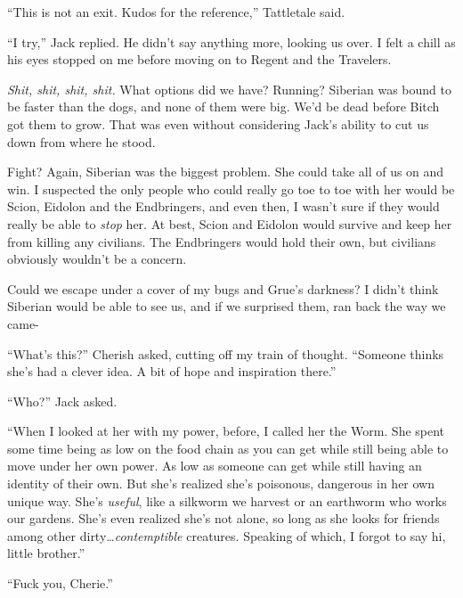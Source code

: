 
``This is not an exit.  Kudos for the reference,'' Tattletale said.



``I try,'' Jack replied.  He didn't say anything more, looking us over.  I felt a chill as his eyes stopped on me before moving on to Regent and the Travelers.



\emph{Shit, shit, shit, shit.}  What options did we have?  Running?  Siberian was bound to be faster than the dogs, and none of them were big.  We'd be dead before Bitch got them to grow.  That was even without considering Jack's ability to cut us down from where he stood.



Fight?  Again, Siberian was the biggest problem.  She could take all of us on and win.  I suspected the only people who could really go toe to toe with her would be Scion, Eidolon and the Endbringers, and even then, I wasn't sure if they would really be able to \emph{stop} her.  At best, Scion and Eidolon would survive and keep her from killing any civilians.  The Endbringers would hold their own, but civilians obviously wouldn't be a concern.



Could we escape under a cover of my bugs and Grue's darkness?  I didn't think Siberian would be able to see us, and if we surprised them, ran back the way we came-



``What's this?'' Cherish asked, cutting off my train of thought. ``Someone thinks she's had a clever idea.  A bit of hope and inspiration there.''



``Who?'' Jack asked.



``When I looked at her with my power, before, I called her the Worm.  She spent some time being as low on the food chain as you can get while still being able to move under her own power.  As low as someone can get while still having an identity of their own.  But she's realized she's poisonous, dangerous in her own unique way.  She's \emph{useful}, like a silkworm we harvest or an earthworm who works our gardens.  She's even realized she's not alone, so long as she looks for friends among other dirty\ldots \emph{contemptible} creatures.  Speaking of which, I forgot to say hi, little brother.''



``Fuck you, Cherie.''



